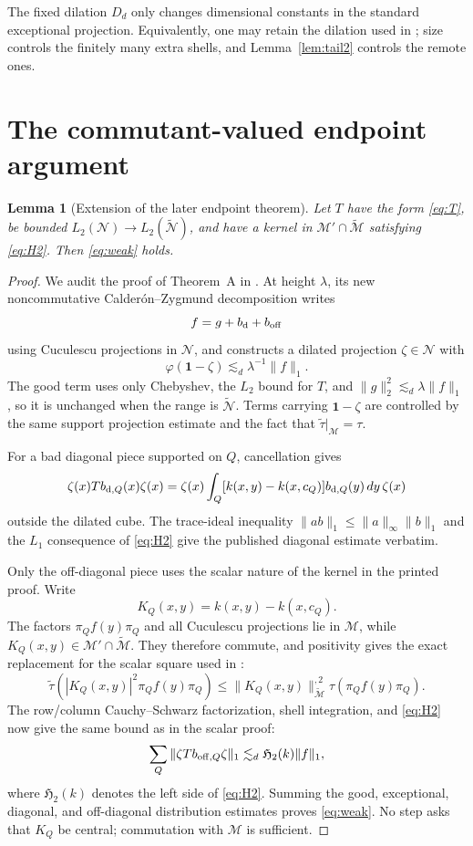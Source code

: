 \documentclass[11pt]{article}
\newtheorem{lemma}[theorem]{Lemma}
\newcommand{\M}{\mathcal M}
\newcommand{\Mt}{\widetilde{\mathcal M}}
\newcommand{\N}{\mathcal N}
\newcommand{\Nt}{\widetilde{\mathcal N}}
\newcommand{\vphi}{\varphi}
\begin{document}
The fixed dilation $D_d$ only changes dimensional constants in the standard
exceptional projection.  Equivalently, one may retain the dilation used in
\cite{ccap}; size controls the finitely many extra shells, and
Lemma~\ref{lem:tail2} controls the remote ones.

\section{The commutant-valued endpoint argument}

\begin{lemma}[Extension of the later endpoint theorem]\label{lem:commutant}
Let $T$ have the form \eqref{eq:T}, be bounded
$L_2(\N)\to L_2(\Nt)$, and have a kernel in $\M'\cap\Mt$ satisfying
\eqref{eq:H2}.  Then \eqref{eq:weak} holds.
\end{lemma}

\begin{proof}
We audit the proof of Theorem~A in \cite{ccap}.  At height $\lambda$, its new
noncommutative Calder\'on--Zygmund decomposition writes
\[
 f=g+b_{\rm d}+b_{\rm off}
\]
using Cuculescu projections in $\N$, and constructs a dilated projection
$\zeta\in\N$ with
\[
 \vphi(\mathbf1-\zeta)
 \lesssim_d\lambda^{-1}\|f\|_1.
\]
The good term uses only Chebyshev, the $L_2$ bound for $T$, and
$\|g\|_2^2\lesssim_d\lambda\|f\|_1$, so it is unchanged when the range is
$\Nt$.  Terms carrying $\mathbf1-\zeta$ are controlled by the same support
projection estimate and the fact that $\widetilde\tau|_{\M}=\tau$.

For a bad diagonal piece supported on $Q$, cancellation gives
\[
 \zeta(x)T b_{{\rm d},Q}(x)\zeta(x)
 =\zeta(x)\int_Q
 [k(x,y)-k(x,c_Q)]b_{{\rm d},Q}(y)\,dy\,\zeta(x)
\]
outside the dilated cube.  The trace-ideal inequality
$\|ab\|_1\le\|a\|_\infty\|b\|_1$ and the $L_1$ consequence of
\eqref{eq:H2} give the published diagonal estimate verbatim.

Only the off-diagonal piece uses the scalar nature of the kernel in the
printed proof.  Write
\[
 K_Q(x,y)=k(x,y)-k(x,c_Q).
\]
The factors $\pi_Qf(y)\pi_Q$ and all Cuculescu projections lie in $\M$, while
$K_Q(x,y)\in\M'\cap\Mt$.  They therefore commute, and positivity gives the
exact replacement for the scalar square used in \cite{ccap}:
\begin{equation}\label{eq:keytrace}
 \widetilde\tau\!\left(
 |K_Q(x,y)|^2\pi_Qf(y)\pi_Q\right)
 \le \|K_Q(x,y)\|_{\Mt}^{,2}
     \tau\!\left(\pi_Qf(y)\pi_Q\right).
\end{equation}
The row/column Cauchy--Schwarz factorization, shell integration, and
\eqref{eq:H2} now give the same bound as in the scalar proof:
\[
 \sum_Q\|\zeta T b_{{\rm off},Q}\zeta\|_1
 \lesssim_d \mathfrak H_2(k)\|f\|_1,
\]
where $\mathfrak H_2(k)$ denotes the left side of \eqref{eq:H2}.  Summing the
good, exceptional, diagonal, and off-diagonal distribution estimates proves
\eqref{eq:weak}.  No step asks that $K_Q$ be central; commutation with $\M$
is sufficient.
\end{proof}
\end{document}
